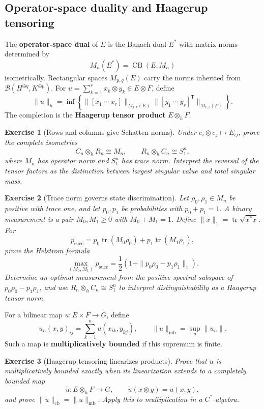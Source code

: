 \documentclass{article}
\newtheorem{exercise}{Exercise}
\newcommand{\trace}{\operatorname{tr}}
\begin{document}
\subsection{Operator-space duality and Haagerup tensoring}

The \textbf{operator-space dual} of $E$ is the Banach dual $E^*$ with matrix
norms determined by
\[
M_n(E^*)=\operatorname{CB}(E,M_n)
\]
isometrically. Rectangular spaces $M_{p,q}(E)$ carry the norms inherited from
$\mathcal B(H^{\oplus q},K^{\oplus p})$. For
$u=\sum_{k=1}^r x_k\otimes y_k\in E\otimes F$, define
\[
\|u\|_h
=\inf\left\{
\|[x_1\ \cdots\ x_r]\|_{M_{1,r}(E)}
\|[y_1\ \cdots\ y_r]^{\mathsf T}\|_{M_{r,1}(F)}
\right\}.
\]
The completion is the \textbf{Haagerup tensor product} $E\otimes_hF$.

\begin{exercise}[Rows and columns give Schatten norms]
\leavevmode\par
\textit{Under $e_i\otimes e_j\mapsto E_{ij}$, prove the complete isometries}
\[
C_n\otimes_hR_n\cong M_n,
\qquad
R_n\otimes_hC_n\cong S_1^n,
\]
\textit{where $M_n$ has operator norm and $S_1^n$ has trace norm. Interpret
the reversal of the tensor factors as the distinction between largest
singular value and total singular mass.}
\end{exercise}

\begin{exercise}[Trace norm governs state discrimination]
\leavevmode\par
\textit{Let $\rho_0,\rho_1\in M_n$ be positive with trace one, and let
$p_0,p_1$ be probabilities with $p_0+p_1=1$. A binary measurement is a pair
$M_0,M_1\geq0$ with $M_0+M_1=1$. Define
$\|x\|_1=\trace\sqrt{x^*x}$. For}
\[
p_{\mathrm{succ}}
=p_0\trace(M_0\rho_0)+p_1\trace(M_1\rho_1),
\]
\textit{prove the Helstrom formula \cite{helstrom-detection}}
\[
\max_{(M_0,M_1)}p_{\mathrm{succ}}
=\frac12\left(1+\|p_0\rho_0-p_1\rho_1\|_1\right).
\]
\textit{Determine an optimal measurement from the positive spectral
subspace of $p_0\rho_0-p_1\rho_1$, and use
$R_n\otimes_hC_n\cong S_1^n$ to interpret distinguishability as a Haagerup
tensor norm.}
\end{exercise}

For a bilinear map $u:E\times F\to G$, define
\[
u_n(x,y)_{ij}=\sum_{k=1}^n u(x_{ik},y_{kj}),
\qquad
\|u\|_{\mathrm{mb}}=\sup_n\|u_n\|.
\]
Such a map is \textbf{multiplicatively bounded} if this supremum is finite.

\begin{exercise}[Haagerup tensoring linearizes products]
\leavevmode\par
\textit{Prove that $u$ is multiplicatively bounded exactly when its
linearization extends to a completely bounded map}
\[
\widetilde u:E\otimes_hF\longrightarrow G,
\qquad
\widetilde u(x\otimes y)=u(x,y),
\]
\textit{and prove $\|\widetilde u\|_{\mathrm{cb}}=\|u\|_{\mathrm{mb}}$.
Apply this to multiplication in a $C^*$-algebra.}
\end{exercise}
\end{document}
